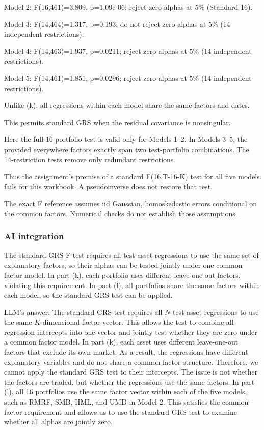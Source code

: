 \documentclass[11pt,letterpaper]{article}
\begin{document}
Model 2: F(16,461)=3.809, p=1.09e-06; reject zero alphas at 5\% (Standard 16).

Model 3: F(14,464)=1.317, p=0.193; do not reject zero alphas at 5\% (14 independent restrictions).

Model 4: F(14,463)=1.937, p=0.0211; reject zero alphas at 5\% (14 independent restrictions).

Model 5: F(14,461)=1.851, p=0.0296; reject zero alphas at 5\% (14 independent restrictions).

Unlike (k), all regressions within each model share the same factors and dates.

This permits standard GRS when the residual covariance is nonsingular.

Here the full 16-portfolio test is valid only for Models 1--2. In Models 3--5, the provided everywhere factors exactly span two test-portfolio combinations. The 14-restriction tests remove only redundant restrictions.

Thus the assignment's premise of a standard F(16,T-16-K) test for all five models fails for this workbook. A pseudoinverse does not restore that test.

The exact F reference assumes iid Gaussian, homoskedastic errors conditional on the common factors. Numerical checks do not establish those assumptions.


\subsubsection*{AI integration}


The standard GRS F-test requires all test-asset regressions to use the same set of explanatory factors, so their alphas can be tested jointly under one common factor model. In part (k), each portfolio uses different leave-one-out factors, violating this requirement. In part (l), all portfolios share the same factors within each model, so the standard GRS test can be applied.


LLM's answer: The standard GRS test requires all \(N\) test-asset regressions to use the same \(K\)-dimensional factor vector. This allows the test to combine all regression intercepts into one vector and jointly test whether they are zero under a common factor model. In part (k), each asset uses different leave-one-out factors that exclude its own market. As a result, the regressions have different explanatory variables and do not share a common factor structure. Therefore, we cannot apply the standard GRS test to their intercepts. The issue is not whether the factors are traded, but whether the regressions use the same factors. In part (l), all 16 portfolios use the same factor vector within each of the five models, such as RMRF, SMB, HML, and UMD in Model 2. This satisfies the common-factor requirement and allows us to use the standard GRS test to examine whether all alphas are jointly zero.
\end{document}
